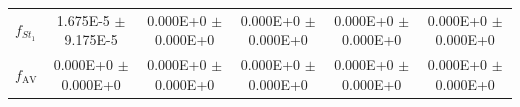 \documentclass[conference]{IEEEtran}
\begin{document}
\begin{table}[!t]
\begin{tabular}{|l|c|c|c|c|c|}
		$f_{\textit{St}_1}$ & \cellcolor[HTML]{DFDFDF}1.675E-5 $\pm$ 9.175E-5                        & 0.000E+0 $\pm$ 0.000E+0                                                & 0.000E+0 $\pm$ 0.000E+0                                                & 0.000E+0 $\pm$ 0.000E+0                                                & 0.000E+0 $\pm$ 0.000E+0                                                \\
		$f_{\text{AV}}$     & 0.000E+0 $\pm$ 0.000E+0                                                & 0.000E+0 $\pm$ 0.000E+0                                                & 0.000E+0 $\pm$ 0.000E+0                                                & 0.000E+0 $\pm$ 0.000E+0                                                & 0.000E+0 $\pm$ 0.000E+0                                                \\ \hline
	\end{tabular}
\end{table}
\end{document}
